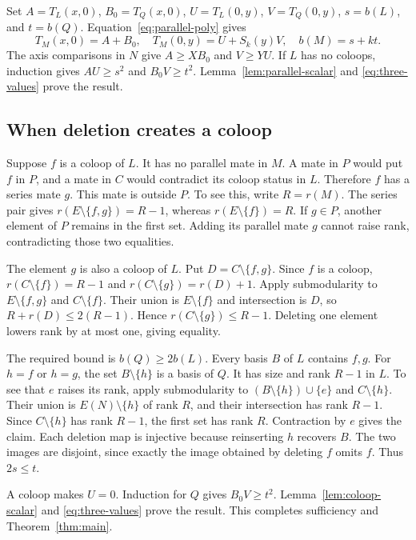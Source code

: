 \documentclass[11pt,a4paper]{article}
\begin{document}
Set $A=T_L(x,0)$, $B_0=T_Q(x,0)$, $U=T_L(0,y)$, $V=T_Q(0,y)$,
$s=b(L)$, and $t=b(Q)$. Equation~\eqref{eq:parallel-poly} gives
\begin{equation}\label{eq:three-values}
T_M(x,0)=A+B_0,\quad T_M(0,y)=U+S_k(y)V,\quad b(M)=s+kt.
\end{equation}
The axis comparisons in $N$ give $A\geq XB_0$ and $V\geq YU$.
If $L$ has no coloops, induction gives $AU\geq s^2$ and $B_0V\geq t^2$.
Lemma~\ref{lem:parallel-scalar} and \eqref{eq:three-values} prove the result.

\subsection{When deletion creates a coloop}
Suppose $f$ is a coloop of $L$. It has no parallel mate in $M$.
A mate in $P$ would put $f$ in $P$, and a mate in $C$ would contradict
its coloop status in $L$. Therefore $f$ has a series mate $g$.
This mate is outside $P$. To see this, write $R=r(M)$.
The series pair gives $r(E\setminus\{f,g\})=R-1$, whereas
$r(E\setminus\{f\})=R$. If $g\in P$, another element of $P$ remains
in the first set. Adding its parallel mate $g$ cannot raise rank,
contradicting those two equalities.

The element $g$ is also a coloop of $L$. Put $D=C\setminus\{f,g\}$.
Since $f$ is a coloop,
$r(C\setminus\{f\})=R-1$ and $r(C\setminus\{g\})=r(D)+1$.
Apply submodularity to $E\setminus\{f,g\}$ and $C\setminus\{f\}$.
Their union is $E\setminus\{f\}$ and intersection is $D$, so
$R+r(D)\leq2(R-1)$. Hence $r(C\setminus\{g\})\leq R-1$.
Deleting one element lowers rank by at most one, giving equality.

The required bound is $b(Q)\geq2b(L)$. Every basis $B$ of $L$ contains $f,g$.
For $h=f$ or $h=g$, the set $B\setminus\{h\}$ is a basis of $Q$.
It has size and rank $R-1$ in $L$. To see that $e$ raises its rank,
apply submodularity to $(B\setminus\{h\})\cup\{e\}$ and
$C\setminus\{h\}$. Their union is $E(N)\setminus\{h\}$ of rank $R$,
and their intersection has rank $R-1$. Since $C\setminus\{h\}$ has
rank $R-1$, the first set has rank $R$. Contraction by $e$ gives the claim.
Each deletion map is injective because reinserting $h$ recovers $B$.
The two images are disjoint, since exactly the image obtained by deleting
$f$ omits $f$. Thus $2s\leq t$.

A coloop makes $U=0$. Induction for $Q$ gives $B_0V\geq t^2$.
Lemma~\ref{lem:coloop-scalar} and \eqref{eq:three-values} prove the result.
This completes sufficiency and Theorem~\ref{thm:main}.
\end{document}
